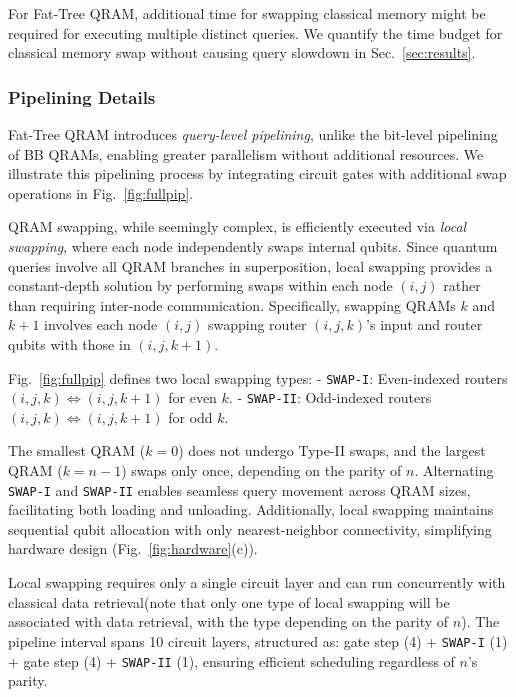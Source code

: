 For Fat-Tree QRAM, additional time for swapping classical memory might be required for executing multiple distinct queries. We quantify the time budget for classical memory swap without causing query slowdown in Sec.~\ref{sec:results}.


\subsubsection{Pipelining Details}

Fat-Tree QRAM introduces \emph{query-level pipelining}, unlike the bit-level pipelining of BB QRAMs, enabling greater parallelism without additional resources. We illustrate this pipelining process by integrating circuit gates with additional swap operations in Fig.~\ref{fig:fullpip}.  

QRAM swapping, while seemingly complex, is efficiently executed via \emph{local swapping}, where each node independently swaps internal qubits. Since quantum queries involve all QRAM branches in superposition, local swapping provides a constant-depth solution by performing swaps within each node $(i,j)$ rather than requiring inter-node communication. Specifically, swapping QRAMs $k$ and $k+1$ involves each node $(i,j)$ swapping router $(i, j, k)$'s input and router qubits with those in $(i,j,k+1)$.  

Fig.~\ref{fig:fullpip} defines two local swapping types:  
- \texttt{SWAP-I}: Even-indexed routers $(i,j,k) \Leftrightarrow (i,j,k+1)$ for even $k$.  
- \texttt{SWAP-II}: Odd-indexed routers $(i,j,k) \Leftrightarrow (i,j,k+1)$ for odd $k$.  

The smallest QRAM ($k=0$) does not undergo Type-II swaps, and the largest QRAM ($k=n-1$) swaps only once, depending on the parity of $n$. Alternating \texttt{SWAP-I} and \texttt{SWAP-II} enables seamless query movement across QRAM sizes, facilitating both loading and unloading. Additionally, local swapping maintains sequential qubit allocation with only nearest-neighbor connectivity, simplifying hardware design (Fig.~\ref{fig:hardware}(c)).  

Local swapping requires only a single circuit layer and can run concurrently with classical data retrieval(note that only one type of local swapping will be associated with data retrieval, with the type depending on the parity of $n$). The pipeline interval spans 10 circuit layers, structured as: gate step (4) + \texttt{SWAP-I} (1) + gate step (4) + \texttt{SWAP-II} (1), ensuring efficient scheduling regardless of $n$’s parity.  

